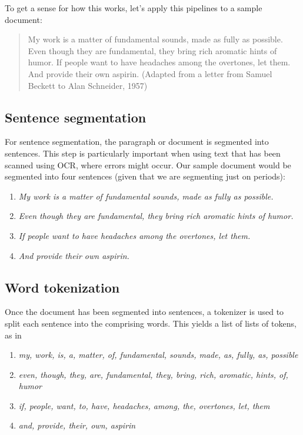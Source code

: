 To get a sense for how this works, let's apply this pipelines to a sample document:

\begin{quote}
My work is a matter of fundamental sounds, made as fully as possible. Even though they are fundamental, they bring rich aromatic hints of humor. If people want to have headaches among the overtones, let them. And provide their own aspirin. (Adapted from a letter from Samuel Beckett to Alan Schneider, 1957)
\end{quote}

\subsection{Sentence segmentation} 

For sentence segmentation, the paragraph or document is segmented into sentences. This step is particularly important when using text that has been scanned using OCR, where errors might occur. Our sample document would be segmented into four sentences (given that we are segmenting just on periods):

\begin{enumerate}
    \item \textit{My work is a matter of fundamental sounds, made as fully as possible.}
    \item \textit{Even though they are fundamental, they bring rich aromatic hints of humor.}
    \item \textit{If people want to have headaches among the overtones, let them.}
    \item \textit{And provide their own aspirin.}
\end{enumerate}

\subsection{Word tokenization} 

Once the document has been segmented into sentences, a tokenizer is used to split each sentence into the comprising words. This yields a list of lists of tokens, as in
\begin{enumerate}
    \item \textit{my, work, is, a, matter, of, fundamental, sounds, made, as, fully, as, possible}
    \item \textit{even, though, they, are, fundamental, they, bring, rich, aromatic, hints, of, humor}
    \item \textit{if, people, want, to, have, headaches, among, the, overtones, let, them}
    \item \textit{and, provide, their, own, aspirin}
\end{enumerate}

